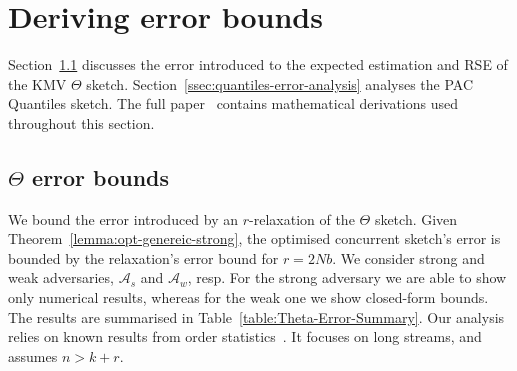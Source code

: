 \section{Deriving error bounds}
\label{sec:error-bounds}
Section~\ref{ssec:theta-analysis} discusses the error introduced to the
expected estimation and RSE of the KMV $\Theta$ sketch.
Section~\ref{ssec:quantiles-error-analysis} analyses the PAC Quantiles sketch.
The full paper~\cite{rinberg2019fast} contains mathematical derivations used throughout this section. 

\subsection{$\Theta$ error bounds}
\label{ssec:theta-analysis}

We bound the error introduced by an $r$-relaxation of the $\Theta$ sketch. Given
Theorem~\ref{lemma:opt-genereic-strong}, the optimised concurrent sketch's error is bounded
by the relaxation's error bound for $r=2N$$b$. We consider strong and weak adversaries,
${\mathcal{A}}_s$ and ${\mathcal{A}}_w$, resp. For the strong adversary we are able to show only numerical
results, whereas for the weak one we show closed-form bounds. The results are summarised in Table~\ref{table:Theta-Error-Summary}.
Our analysis relies on known results from order statistics~\cite{david2004order}.
It focuses on long streams, and assumes $n>k+r$.


